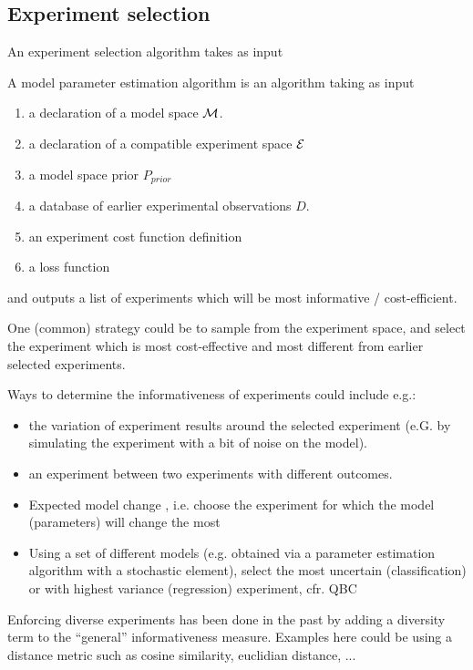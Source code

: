 \documentclass{article}
\begin{document}
\subsection{Experiment selection}

An experiment selection algorithm takes as input


A model parameter estimation algorithm is an algorithm taking as input
\begin{enumerate}
\item a declaration of a model space $\mathcal{M}$.
\item a declaration of a compatible experiment space $\mathcal{E}$
\item a model space prior $P_{prior}$
\item a database of earlier experimental observations $D$.
\item an experiment cost function definition
\item a loss function
\end{enumerate}

and outputs a list of experiments which will be most informative / cost-efficient.

One (common) strategy could be to sample from the experiment space, and select the experiment which is most cost-effective and most different from earlier selected experiments.

Ways to determine the informativeness of experiments could include e.g.:
\begin{itemize}
\item the variation of experiment results around the selected experiment (e.G. by simulating the experiment with a bit of noise on the model).
\item an experiment between two experiments with different outcomes.
\item Expected model change \cite{cai2013maximizing}, i.e. choose the experiment for which the model (parameters) will change the most
\item Using a set of different models (e.g. obtained via a parameter estimation algorithm with a stochastic element), select the most uncertain (classification) or with highest variance (regression) experiment, cfr. QBC
\end{itemize}
Enforcing diverse experiments has been done in the past \cite{xu2007incorporating} by adding a diversity term to the ``general'' informativeness measure. Examples here could be using a distance metric such as cosine similarity, euclidian distance, ...
 
\end{document}
